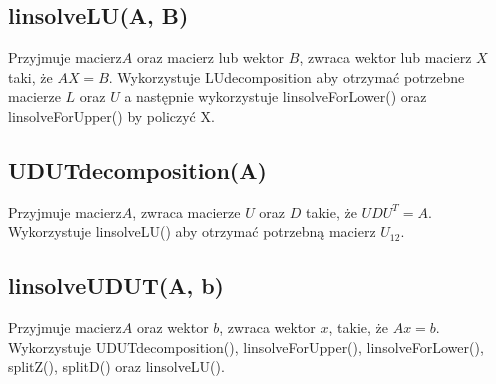 \documentclass{article}
\begin{document}
    \subsection*{linsolveLU(A, B)}
Przyjmuje macierz\(A\) oraz macierz lub wektor \(B\), zwraca wektor lub macierz \(X\) taki, że \(AX = B\). Wykorzystuje LUdecomposition aby otrzymać potrzebne macierze \(L\) oraz \(U\) a następnie wykorzystuje linsolveForLower() oraz linsolveForUpper() by policzyć X.
    \subsection*{UDUTdecomposition(A)}
Przyjmuje macierz\(A\), zwraca macierze \(U\) oraz \(D\) takie, że \(UDU^T = A\). Wykorzystuje linsolveLU() aby otrzymać potrzebną macierz \(U_{12}\).
    \subsection*{linsolveUDUT(A, b)}
Przyjmuje macierz\(A\) oraz wektor \(b\), zwraca wektor \(x\), takie, że \(Ax = b\). Wykorzystuje UDUTdecomposition(), linsolveForUpper(), linsolveForLower(), splitZ(), splitD() oraz linsolveLU().
\end{document}
